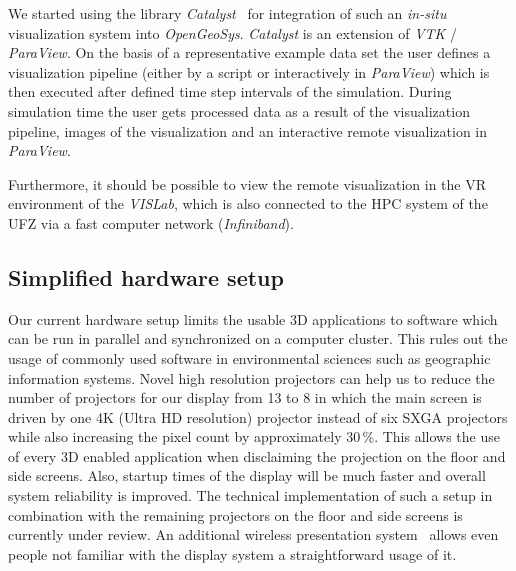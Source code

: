 \documentclass[twocolumn]{svjour3}          %
\begin{document}
We started using the library \emph{Catalyst}~\cite{web:catalyst} for integration of such an \emph{in-situ} visualization system into \emph{OpenGeoSys}. \emph{Catalyst} is an extension of \emph{VTK} / \emph{ParaView}. On the basis of a representative example data set the user defines a visualization pipeline (either by a script or interactively in \emph{Para\-View}) which is then executed after defined time step intervals of the simulation. During simulation time the user gets processed data as a result of the visualization pipeline, images of the visualization and an interactive remote visualization in \emph{ParaView}.

Furthermore, it should be possible to view the remote visualization in the VR environment of the \emph{VISLab}, which is also connected to the HPC system of the UFZ via a fast computer network (\emph{Infiniband}).

\subsection{Simplified hardware setup}
\label{simplified-hardware-setup}

Our current hardware setup limits the usable 3D applications to software which can be run in parallel and synchronized on a computer cluster. This rules out the usage of commonly used software in environmental sciences such as geographic information systems. Novel high resolution projectors can help us to reduce the number of projectors for our display from 13 to 8 in which the main screen is driven by one 4K (Ultra HD resolution) projector instead of six SXGA projectors while also increasing the pixel count by approximately 30\,\%. This allows the use of every 3D enabled application when disclaiming the projection on the floor and side screens. Also, startup times of the display will be much faster and overall system reliability is improved. The technical implementation of such a setup in combination with the remaining projectors on the floor and side screens is currently under review. An additional wireless presentation system~\cite{web:clickshare} allows even people not familiar with the display system a straightforward usage of it.

\end{document}
